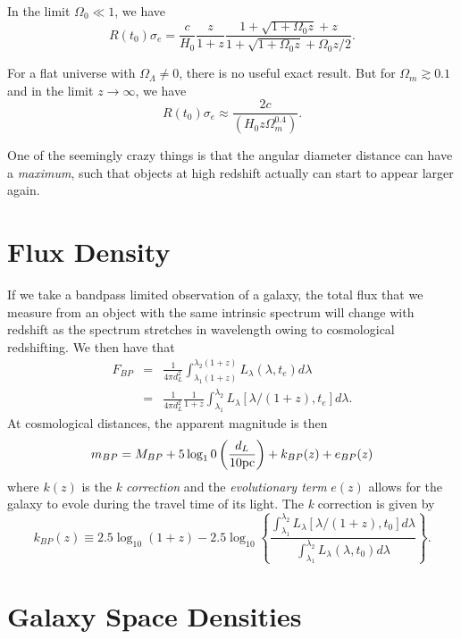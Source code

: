 \documentclass[]{article}
\begin{document}
In the limit $\Omega_0\ll1$, we have
\begin{equation}
R(t_0)\sigma_e = \frac{c}{H_0} \frac{z}{1+z} \frac{1+\sqrt{1+\Omega_0 z}+z}{1+ \sqrt{1+\Omega_0 z} + \Omega_0 z/2}.
\end{equation}

For a flat universe with $\Omega_\Lambda\ne0$, there is no useful exact 
result.  But for $\Omega_m \gtrsim 0.1$ and in the limit $z\to\infty$, we have 
\begin{equation}
R(t_0)\sigma_e \approx \frac{2c}{(H_0 z \Omega_m^{0.4})}.
\end{equation}

One of the seemingly crazy things is that the angular diameter distance can have
a {\it maximum}, such that objects at high redshift actually can start to 
appear larger again.

\section{Flux Density}

If we take a bandpass limited observation of a galaxy, the total
flux that we measure from an object with the same intrinsic
spectrum will change with redshift as the spectrum stretches in
wavelength owing to cosmological redshifting.  We then have that
\begin{eqnarray}
F_{BP} &=& \frac{1}{4\pi d_L^2} \int_{\lambda_1(1+z)}^{\lambda_2(1+z)} L_{\lambda}(\lambda,t_e) d\lambda \\
&=& \frac{1}{4\pi d_L^2}\frac{1}{1+z} \int_{\lambda_1}^{\lambda_2} L_{\lambda}[\lambda/(1+z),t_e]d \lambda.
\end{eqnarray}
\noindent
At cosmological distances, the apparent magnitude is then
\begin{equation}
m_{BP} = M_{BP} + 5 \log_10 \left(\frac{d_L}{10\mathrm{pc}}\right) + k_{BP}(z) + e_{BP}(z)
\end{equation}
\noindent
where $k(z)$ is the {\it k correction} and the {\it evolutionary term} $e(z)$
allows for the galaxy to evole during the travel time of its light.  The
{\it k} correction is given by
\begin{equation}
k_{BP}(z) \equiv 2.5 \log_{10} (1+z) - 2.5 \log_{10} \left\{ \frac{\int_{\lambda_1}^{\lambda_2} L_{\lambda}[\lambda/(1+z),t_0]d\lambda}{\int_{\lambda_1}^{\lambda_2} L_{\lambda}(\lambda,t_0)d\lambda   } \right\}.
\end{equation}


\section{Galaxy Space Densities}
\end{document}
